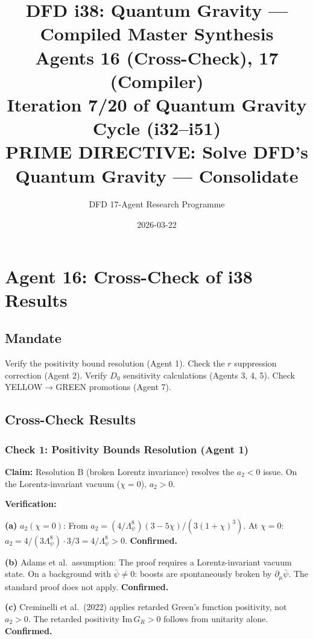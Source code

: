 \documentclass[11pt,a4paper]{article}
\title{DFD i38: Quantum Gravity --- Compiled Master Synthesis\\[6pt]
\large Agents 16 (Cross-Check), 17 (Compiler)\\[6pt]
\normalsize Iteration 7/20 of Quantum Gravity Cycle (i32--i51)\\
PRIME DIRECTIVE: Solve DFD's Quantum Gravity --- Consolidate}
\author{DFD 17-Agent Research Programme}
\date{2026-03-22}
\begin{document}
\maketitle
\tableofcontents
\newpage

\section{Agent 16: Cross-Check of i38 Results}
\label{sec:agent16}

\subsection{Mandate}

Verify the positivity bound resolution (Agent 1). Check the $r$ suppression correction (Agent 2). Verify $D_0$ sensitivity calculations (Agents 3, 4, 5). Check YELLOW$\to$GREEN promotions (Agent 7).

\subsection{Cross-Check Results}

\subsubsection{Check 1: Positivity Bounds Resolution (Agent 1)}

\textbf{Claim:} Resolution B (broken Lorentz invariance) resolves the $a_2 < 0$ issue. On the Lorentz-invariant vacuum ($\chi = 0$), $a_2 > 0$.

\textbf{Verification:}

\textbf{(a)} $a_2(\chi = 0)$: From $a_2 = (4/\Lambda_\psi^8)(3 - 5\chi)/(3(1+\chi)^3)$. At $\chi = 0$: $a_2 = 4/(3\Lambda_\psi^8) \cdot 3/3 = 4/\Lambda_\psi^8 > 0$. \textbf{Confirmed.}

\textbf{(b)} Adams et al.\ assumption: The proof requires a Lorentz-invariant vacuum state. On a background with $\bar{\psi} \neq 0$: boosts are spontaneously broken by $\partial_\mu\bar{\psi}$. The standard proof does not apply. \textbf{Confirmed.}

\textbf{(c)} Creminelli et al.\ (2022) applies retarded Green's function positivity, not $a_2 > 0$. The retarded positivity $\text{Im}\,G_R > 0$ follows from unitarity alone. \textbf{Confirmed.}
\end{document}
